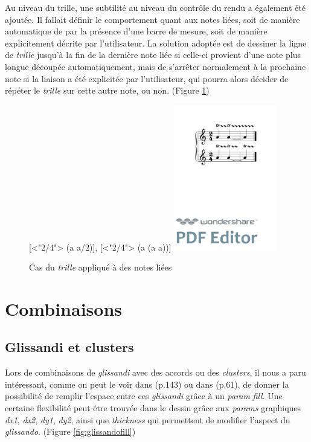 \documentclass{article}
\newenvironment{gmncode}	{\vspace{-2mm}\small\verbatim}{\endverbatim\vspace{-2mm}}
\begin{document}
Au niveau du trille, une subtilité au niveau du contr\^ole du rendu a également été ajoutée. Il fallait définir le comportement quant aux notes liées, soit de manière automatique de par la présence d'une barre de mesure, soit de manière explicitement décrite par l'utilisateur. La solution adoptée est de dessiner la ligne de \emph{trille} jusqu'à la fin de la dernière note liée si celle-ci provient d'une note plus longue découpée automatiquement, mais de s'arrêter normalement à la prochaine note si la liaison a été explicitée par l'utilisateur, qui pourra alors décider de répéter le \emph{trille} sur cette autre note, ou non. (Figure \ref{fig:trill})

\begin{figure}[h]
\centering
\begin{gmncode}
{
  [\meter<"2/4"> \trill({a} {a/2})],
  [\meter<"2/4"> \trill({a} \tie({a} {a}))]
}
\end{gmncode}
\includegraphics[width=45mm]{img/trill.pdf}
\caption{Cas du \emph{trille} appliqué à des notes liées}
\label{fig:trill}
\end{figure}

\section{Combinaisons}\label{sec:combinaisons}

\subsection{Glissandi et clusters}\label{subsec:glissandiCluster}

Lors de combinaisons de \emph{glissandi}  avec des accords ou des \emph{clusters}, il nous a paru intéressant, comme on peut le voir dans \cite{gould2011behind} (p.143) ou dans \cite{stone1980music} (p.61), de donner la possibilité de remplir l'espace entre ces \emph{glissandi} grâce à un \emph{param} \emph{fill}. Une certaine flexibilité peut être trouvée dans le dessin grâce aux \emph{params} graphiques \emph{dx1}, \emph{dx2}, \emph{dy1}, \emph{dy2}, ainsi que \emph{thickness} qui permettent de modifier l'aspect du \emph{glissando}. (Figure \ref{fig:glissandofill})
\end{document}
